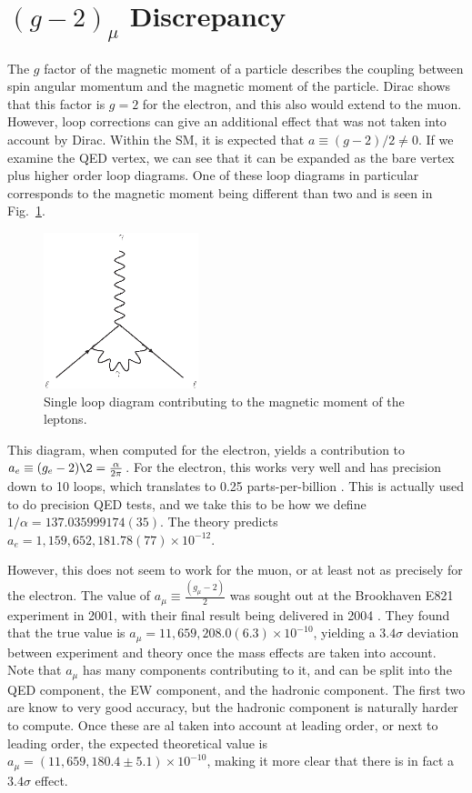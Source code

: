 \section{$(g-2)_\mu$ Discrepancy}
The $g$ factor of the magnetic moment of a particle describes the coupling between spin angular momentum and the magnetic moment of the particle.
Dirac shows that this factor is $g=2$ for the electron, and this also would extend to the muon.
However, loop corrections can give an additional effect that was not taken into account by Dirac.
Within the SM, it is expected that $a \equiv (g-2)/2 \neq 0$.
If we examine the QED vertex, we can see that it can be expanded as the bare vertex plus higher order loop diagrams.
One of these loop diagrams in particular corresponds to the magnetic moment being different than two and is seen in Fig.~\ref{fig:magnetic_moment}.

\begin{figure}[h]
    \centering
    \includegraphics[width=0.4\textwidth]{Figures/feynman_diagrams/muon_magnetic_moment}
    \caption{Single loop diagram contributing to the magnetic moment of the leptons.}
    \label{fig:magnetic_moment}
\end{figure}

This diagram, when computed for the electron, yields a contribution to $a_e \equiv (g_e - 2)\2 = \frac{\alpha}{2\pi}$.
For the electron, this works very well and has precision down to 10 loops, which translates to 0.25 parts-per-billion \cite{Aoyama:2012wj}.
This is actually used to do precision QED tests, and we take this to be how we define $1/\alpha = 137.035999174(35)$.
The theory predicts $a_e = 1,159,652,181.78(77)\times 10^{-12}$.

However, this does not seem to work for the muon, or at least not as precisely for the electron.
The value of $a_\mu \equiv \frac{(g_\mu-2)}{2}$ was sought out at the Brookhaven E821 experiment in 2001, with their final result being delivered in 2004 \cite{Hagiwara:2006jt}.
They found that the true value is $a_\mu = 11,659,208.0(6.3)\times 10^{-10}$, yielding a $3.4\sigma$ deviation between experiment and theory once the mass effects are taken into account.
Note that $a_\mu$ has many components contributing to it, and can be split into the QED component, the EW component, and the hadronic component.
The first two are know to very good accuracy, but the hadronic component is naturally harder to compute.
Once these are al taken into account at leading order, or next to leading order, the expected theoretical value is $a_\mu = (11,659,180.4 \pm 5.1)\times 10^{-10}$, making it more clear that there is in fact a $3.4\sigma$ effect.

